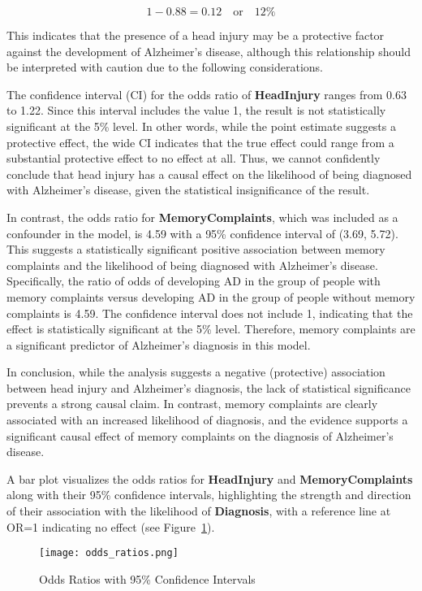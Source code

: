 \documentclass[12pt]{article}
\begin{document}
\[
1 - 0.88 = 0.12 \quad \text{or} \quad 12\%
\]

This indicates that the presence of a head injury may be a protective factor against the development of Alzheimer's disease, although this relationship should be interpreted with caution due to the following considerations.

The confidence interval (CI) for the odds ratio of \textbf{HeadInjury} ranges from 0.63 to 1.22. Since this interval includes the value 1, the result is not statistically significant at the 5\% level. In other words, while the point estimate suggests a protective effect, the wide CI indicates that the true effect could range from a substantial protective effect to no effect at all. Thus, we cannot confidently conclude that head injury has a causal effect on the likelihood of being diagnosed with Alzheimer's disease, given the statistical insignificance of the result.

In contrast, the odds ratio for \textbf{MemoryComplaints}, which was included as a confounder in the model, is 4.59 with a 95\% confidence interval of (3.69, 5.72). This suggests a statistically significant positive association between memory complaints and the likelihood of being diagnosed with Alzheimer's disease. Specifically, the ratio of odds of developing AD in the group of people with memory complaints versus developing AD in the group of people without memory complaints is 4.59. The confidence interval does not include 1, indicating that the effect is statistically significant at the 5\% level. Therefore, memory complaints are a significant predictor of Alzheimer's diagnosis in this model.

In conclusion, while the analysis suggests a negative (protective) association between head injury and Alzheimer's diagnosis, the lack of statistical significance prevents a strong causal claim. In contrast, memory complaints are clearly associated with an increased likelihood of diagnosis, and the evidence supports a significant causal effect of memory complaints on the diagnosis of Alzheimer's disease.

A bar plot visualizes the odds ratios for \textbf{HeadInjury} and \textbf{MemoryComplaints} along with their 95\% confidence intervals, highlighting the strength and direction of their association with the likelihood of \textbf{Diagnosis}, with a reference line at OR=1 indicating no effect (see Figure~\ref{fig:odds_ratios_plot}).


\begin{figure}[H]
    \centering
    \texttt{[image: odds\_ratios.png]}
    \caption{Odds Ratios with 95\% Confidence Intervals}
    \label{fig:odds_ratios_plot}
\end{figure}
\end{document}
